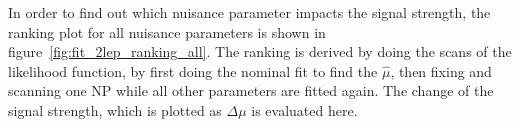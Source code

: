 
In order to find out which nuisance parameter impacts the signal strength, the ranking plot for all nuisance parameters is shown in figure~\ref{fig:fit_2lep_ranking_all}. 
The ranking is derived by doing the scans of the likelihood function, by first doing the nominal fit to find the $\hat{\mu}$, then fixing and scanning one NP while all other parameters are fitted again.
The change of the signal strength, which is plotted as $\Delta\mu$ is evaluated here.

